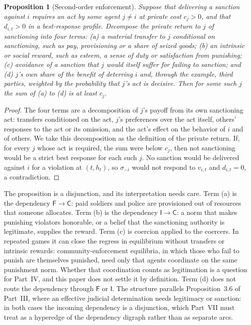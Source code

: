 \documentclass[11pt,letterpaper]{article}
\newtheorem{proposition}[theorem]{Proposition}
\theoremstyle{definition}
\theoremstyle{remark}
\newcommand{\pF}{\mathsf{F}}
\newcommand{\pI}{\mathsf{I}}
\newcommand{\pC}{\mathsf{C}}
\begin{document}
\begin{proposition}[Second-order enforcement]
\label{prop:coercive-power:second-order}
Suppose that delivering a sanction against $i$ requires an act by some agent $j \neq i$ at private cost $c_j > 0$, and that $d_{i,t} > 0$ in a best-response profile. Decompose the private return to $j$ of sanctioning into four terms: (a) a material transfer to $j$ conditional on sanctioning, such as pay, provisioning or a share of seized goods; (b) an intrinsic or social reward, such as esteem, a sense of duty or satisfaction from punishing; (c) avoidance of a sanction that $j$ would itself suffer for failing to sanction; and (d) $j$'s own share of the benefit of deterring $i$ and, through the example, third parties, weighted by the probability that $j$'s act is decisive. Then for some such $j$ the sum of (a) to (d) is at least $c_j$.
\end{proposition}

\begin{proof}
The four terms are a decomposition of $j$'s payoff from its own sanctioning act: transfers conditioned on the act, $j$'s preferences over the act itself, others' responses to the act or its omission, and the act's effect on the behavior of $i$ and of others. We take this decomposition as the definition of the private return. If, for every $j$ whose act is required, the sum were below $c_j$, then not sanctioning would be a strict best response for each such $j$. No sanction would be delivered against $i$ for a violation at $(t,h_t)$, so $\sigma_{-i}$ would not respond to $v_{i,t}$ and $d_{i,t} = 0$, a contradiction.
\end{proof}

The proposition is a disjunction, and its interpretation needs care. Term (a) is the dependency $\pF \to \pC$: paid soldiers and police are provisioned out of resources that someone allocates. Term (b) is the dependency $\pI \to \pC$: a norm that makes punishing violators honorable, or a belief that the sanctioning authority is legitimate, supplies the reward. Term (c) is coercion applied to the coercers. In repeated games it can close the regress in equilibrium without transfers or intrinsic rewards: community-enforcement equilibria, in which those who fail to punish are themselves punished, need only that agents coordinate on the same punishment norm. Whether that coordination counts as legitimation is a question for Part~IV, and this paper does not settle it by definition. Term (d) does not route the dependency through $\pF$ or $\pI$. The structure parallels Proposition~3.6 of Part~III, where an effective judicial determination needs legitimacy or sanction: in both cases the incoming dependency is a disjunction, which Part~VII must treat as a hyperedge of the dependency digraph rather than as separate arcs.
\end{document}
